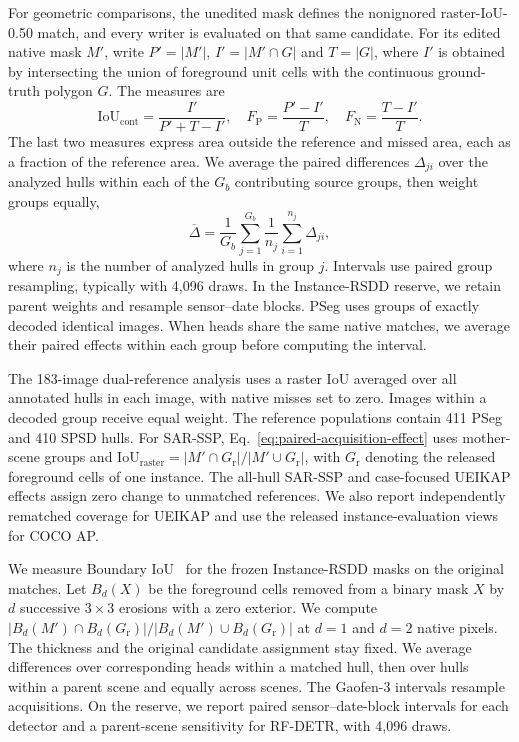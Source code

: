 \documentclass[journal]{IEEEtran}
\begin{document}
For geometric comparisons, the unedited mask defines the nonignored raster-IoU-0.50 match, and every writer is evaluated on that same candidate. For its edited native mask \(M'\), write \(P'=|M'|\), \(I'=|M'\cap G|\) and \(T=|G|\), where \(I'\) is obtained by intersecting the union of foreground unit cells with the continuous ground-truth polygon \(G\). The measures are
\begin{equation}
 \mathrm{IoU}_{\mathrm{cont}}=\frac{I'}{P'+T-I'},\quad
 F_{\mathrm{P}}=\frac{P'-I'}{T},\quad F_{\mathrm{N}}=\frac{T-I'}{T}.
 \label{eq:fixed-geometry-metrics}
\end{equation}
The last two measures express area outside the reference and missed area, each as a fraction of the reference area. We average the paired differences \(\Delta_{ji}\) over the analyzed hulls within each of the \(G_b\) contributing source groups, then weight groups equally,
\begin{equation}
 \overline\Delta=\frac{1}{G_b}\sum_{j=1}^{G_b}
                 \frac{1}{n_j}\sum_{i=1}^{n_j}\Delta_{ji},
 \label{eq:paired-acquisition-effect}
\end{equation}
where \(n_j\) is the number of analyzed hulls in group \(j\). Intervals use paired group resampling, typically with 4,096 draws. In the Instance-RSDD reserve, we retain parent weights and resample sensor--date blocks. PSeg uses groups of exactly decoded identical images. When heads share the same native matches, we average their paired effects within each group before computing the interval.

The 183-image dual-reference analysis uses a raster IoU averaged over all annotated hulls in each image, with native misses set to zero. Images within a decoded group receive equal weight. The reference populations contain 411 PSeg and 410 SPSD hulls. For SAR-SSP, Eq.~\eqref{eq:paired-acquisition-effect} uses mother-scene groups and \(\mathrm{IoU}_{\mathrm{raster}}=|M'\cap G_{\mathrm{r}}|/|M'\cup G_{\mathrm{r}}|\), with \(G_{\mathrm{r}}\) denoting the released foreground cells of one instance. The all-hull SAR-SSP and case-focused UEIKAP effects assign zero change to unmatched references. We also report independently rematched coverage for UEIKAP and use the released instance-evaluation views for COCO AP.

We measure Boundary IoU~\cite{boundaryiou} for the frozen Instance-RSDD masks on the original matches. Let \(B_d(X)\) be the foreground cells removed from a binary mask \(X\) by \(d\) successive \(3\times3\) erosions with a zero exterior. We compute \(|B_d(M')\cap B_d(G_{\mathrm r})|/|B_d(M')\cup B_d(G_{\mathrm r})|\) at \(d=1\) and \(d=2\) native pixels. The thickness and the original candidate assignment stay fixed. We average differences over corresponding heads within a matched hull, then over hulls within a parent scene and equally across scenes. The Gaofen-3 intervals resample acquisitions. On the reserve, we report paired sensor--date-block intervals for each detector and a parent-scene sensitivity for RF-DETR, with 4,096 draws.
\end{document}
